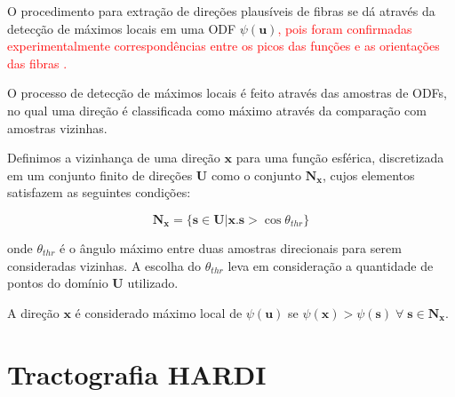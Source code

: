 \documentclass[
    12pt,                %
    oneside,            %
    a4paper,            %
    english,            %
    french,                %
    spanish,            %
    brazil                %
    ]{abntex2}
\begin{document}

O procedimento para extração de direções plausíveis de fibras se dá através da detecção de máximos locais em uma ODF $\psi(\mathbf{u})$\textcolor{red}{, pois foram confirmadas experimentalmente correspondências entre os picos das funções e as orientações das fibras .}

O processo de detecção de máximos locais é feito através das amostras de ODFs, no qual uma direção é classificada como máximo através da comparação com amostras vizinhas.


Definimos a vizinhança de uma direção $\mathbf{x}$ para uma função esférica, discretizada em um conjunto finito de direções $\mathbf{U}$ como o conjunto $\mathbf{N_x}$, cujos elementos satisfazem as seguintes condições:


\begin{equation}
\label{eq::neighboorhood}
    \mathbf{N_x} = \{\mathbf{s} \in \mathbf{U}  | \mathbf{x}.\mathbf{s} > \cos{\theta_{thr}} \}
\end{equation}

onde $\theta_{thr}$ é o ângulo máximo entre duas amostras direcionais para serem consideradas vizinhas. A escolha do $\theta_{thr}$ leva em consideração a quantidade de pontos do domínio $\mathbf{U}$ utilizado.

A direção $\mathbf{x}$ é considerado máximo local de $\psi(\mathbf{u})$ se $\psi(\mathbf{x}) > \psi(\mathbf{s}) \; \forall \; \mathbf{s} \in \mathbf{N_x}$.



\chapter{Tractografia HARDI}
\label{chap::tractografia}
\end{document}
